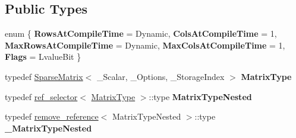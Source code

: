 \subsection*{Public Types}
\begin{DoxyCompactItemize}
\item 
\mbox{\label{struct_eigen_1_1internal_1_1traits_3_01_diagonal_3_01_sparse_matrix_3_01___scalar_00_01___option6bd26e34064fdba33a44f3bb621d4cca_a5aff779351380fc167c4518ca7e2c2c3}} 
enum \{ \newline
{\bfseries Rows\+At\+Compile\+Time} = Dynamic, 
{\bfseries Cols\+At\+Compile\+Time} = 1, 
{\bfseries Max\+Rows\+At\+Compile\+Time} = Dynamic, 
{\bfseries Max\+Cols\+At\+Compile\+Time} = 1, 
\newline
{\bfseries Flags} = Lvalue\+Bit
 \}
\item 
\mbox{\label{struct_eigen_1_1internal_1_1traits_3_01_diagonal_3_01_sparse_matrix_3_01___scalar_00_01___option6bd26e34064fdba33a44f3bb621d4cca_ab4beea6f7c1dd6c7cf13dbcd3828aa77}} 
typedef \mbox{\hyperlink{class_eigen_1_1_sparse_matrix}{Sparse\+Matrix}}$<$ \+\_\+\+Scalar, \+\_\+\+Options, \+\_\+\+Storage\+Index $>$ {\bfseries Matrix\+Type}
\item 
\mbox{\label{struct_eigen_1_1internal_1_1traits_3_01_diagonal_3_01_sparse_matrix_3_01___scalar_00_01___option6bd26e34064fdba33a44f3bb621d4cca_abb8902ebfabc70c00e8505b5c3336da1}} 
typedef \mbox{\hyperlink{struct_eigen_1_1internal_1_1ref__selector}{ref\+\_\+selector}}$<$ \mbox{\hyperlink{class_eigen_1_1_sparse_matrix}{Matrix\+Type}} $>$\+::type {\bfseries Matrix\+Type\+Nested}
\item 
\mbox{\label{struct_eigen_1_1internal_1_1traits_3_01_diagonal_3_01_sparse_matrix_3_01___scalar_00_01___option6bd26e34064fdba33a44f3bb621d4cca_a1099fc895e363c819d5600294311cde0}} 
typedef \mbox{\hyperlink{struct_eigen_1_1internal_1_1remove__reference}{remove\+\_\+reference}}$<$ Matrix\+Type\+Nested $>$\+::type {\bfseries \+\_\+\+Matrix\+Type\+Nested}

\end{DoxyCompactItemize}

